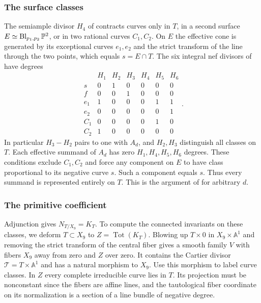 \subsubsection{The surface classes}
The semiample divisor $H_4$ of \cite[\S4.2]{WueCounter} contracts curves
only in $T$, in a second surface $E\simeq\operatorname{Bl}_{p_1,p_2}\mathbb P^2$,
or in two rational curves $C_1,C_2$. On $E$ the effective cone is generated
by its exceptional curves $e_1,e_2$ and the strict transform of the line
through the two points, which equals $s=E\cap T$. The six integral nef
divisors of \cite[Lemma~4.1 and (30)]{WueCounter} have degrees
\[
\begin{array}{c|rrrrrr}
 & H_1&H_2&H_3&H_4&H_5&H_6\\ \hline
 s   &0&1&0&0&0&0\\
 f   &0&0&1&0&0&0\\
 e_1 &1&0&0&0&1&1\\
 e_2 &0&0&0&0&0&1\\
 C_1 &0&0&0&0&1&0\\
 C_2 &1&0&0&0&0&0
\end{array}
 .
\]
In particular $H_3-H_2$ pairs to one with $A_d$, and $H_2,H_3$
distinguish all classes on $T$. Each effective summand of $A_d$ has zero
$H_1,H_4,H_5,H_6$ degrees. These conditions exclude $C_1,C_2$ and force
any component on $E$ to have class proportional to its negative curve $s$.
Such a component equals $s$. Thus every summand is represented entirely
on $T$. This is the argument of \cite[Proposition~4.2]{WueCounter}
for arbitrary $d$.

\subsubsection{The primitive coefficient}
Adjunction gives $N_{T/X_9}=K_T$. To compute the connected invariants on
these classes, we deform $T\subset X_9$ to $Z=\operatorname{Tot}(K_T)$. Blowing up $T\times 0$ in $X_9\times\mathbb A^1$ and removing
the strict transform of the central fiber gives a smooth family $V$ with
fibers $X_9$ away from zero and $Z$ over zero. It contains the Cartier
divisor $\mathcal T=T\times\mathbb A^1$ and has a natural morphism to $X_9$.
Use this morphism to label curve classes. In $Z$ every complete irreducible
curve lies in $T$. Its projection must be nonconstant since the fibers are
affine lines, and the tautological fiber coordinate on its normalization
is a section of a line bundle of negative degree.


